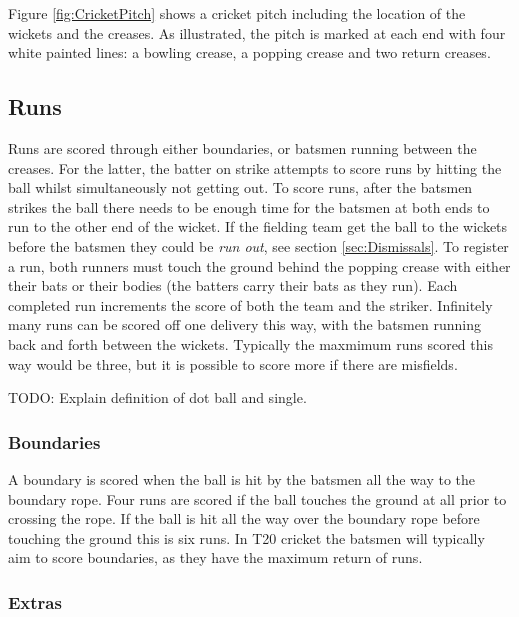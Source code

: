 \documentclass[12pt,a4paper]{report}
\theoremstyle{definition}
\begin{document}
Figure \ref{fig:CricketPitch} shows a cricket pitch including the location of the wickets and the creases.
As illustrated, the pitch is marked at each end with four white painted lines: a bowling crease, a popping crease and two return creases.

\subsection{Runs} \label{sec:Runs}

Runs are scored through either boundaries, or batsmen running between the creases.
For the latter, the batter on strike attempts to score runs by hitting the ball whilst simultaneously not getting out. 
To score runs, after the batsmen strikes the ball there needs to be enough time for the batsmen at both ends to run to the other end of the wicket.
If the fielding team get the ball to the wickets before the batsmen they could be \emph{run out}, see section \ref{sec:Dismissals}.
To register a run, both runners must touch the ground behind the popping crease with either their bats or their bodies (the batters carry their bats as they run). 
Each completed run increments the score of both the team and the striker.
Infinitely many runs can be scored off one delivery this way, with the batsmen running back and forth between the wickets.
Typically the maxmimum runs scored this way would be three, but it is possible to score more if there are misfields.

TODO:  Explain definition of dot ball and single.

\subsubsection{Boundaries} \label{sec:Boundaries}

A boundary is scored when the ball is hit by the batsmen all the way to the boundary rope.
Four runs are scored if the ball touches the ground at all prior to crossing the rope. 
If the ball is hit all the way over the boundary rope before touching the ground this is six runs. 
In T20 cricket the batsmen will typically aim to score boundaries, as they have the maximum return of runs.

\subsubsection{Extras}
\end{document}
